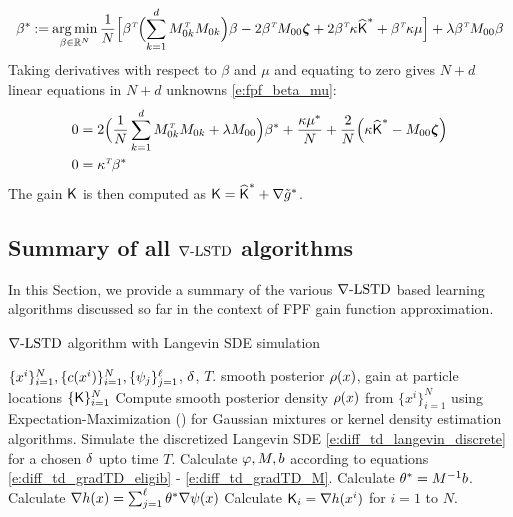 \begin{equation}
\beta ^* \mathbin{:=}
\mathop{\rm arg{\,}min}_{\beta  \in \mathbb{R}^N} \frac{1}{N} \Bigl[  \beta ^{\hbox{\tiny\it T}} \Bigl( \sum_{k=1}^d M_{0k}^{\hbox{\tiny\it T}} M_{0k} \Bigr) \beta   - 2 \beta ^{\hbox{\tiny\it T}}  M_{00} \boldsymbol{\zeta} + 2 \beta ^{\hbox{\tiny\it T}} \kappa \widehat{\text{\sf K}}^* + \beta ^{\hbox{\tiny\it T}} \kappa \mu  \Bigr]+ \lambda \beta ^{\hbox{\tiny\it T}}  M_{00} \beta
\end{equation}
Taking derivatives with respect to $\beta $ and $\mu $ and equating to zero gives $N+d$ linear equations in $N+d$ unknowns \eqref{e:fpf_beta_mu}:
\begin{equation}
\begin{aligned}
0  &=  2 \Bigl(  \frac{1}{N}  \sum_{k=1}^d M_{0k}^\transpose M_{0k}   +  \lambda M_{00} \Bigr) \beta ^* + \frac{ \kappa \mu ^*}{N}+  \frac{2}{N} \Bigl( \kappa \hakFPF^*  -   M_{00} \boldsymbol{\zeta} \Bigr)  \\
0  & = \kappa^{\transpose} \beta^*
\label{e:fpf_beta_mu}
\end{aligned}
\end{equation}
The gain $\text{\sf K}$ is then computed as
$
\text{\sf K} = \widehat{\text{\sf K}}^* + \nabla \tilde g^*$.

\subsection{Summary of all $\nabla\text{-LSTD}$ algorithms}
In this Section, we provide a summary of the various $\nabla\text{-LSTD}$ based learning algorithms discussed so far in the context of FPF gain function approximation. 

\begin{algorithm}{$\nabla\text{-LSTD}$ algorithm with Langevin SDE simulation}
	\begin{algorithmic}[1]
		\Require $\{x^i\}_{i=1}^N, \{c(x^i)\}_{i=1}^N, \{\psi_j\}_{j=1}^{\ell}$, $\delta$, $T$.
		\Ensure smooth posterior $\rho(x)$, gain at particle locations $\{\text{\sf K}\}_{i=1}^N$
		\State Compute smooth posterior density $\rho(x)$ from $\{x^i\}_{i=1}^N$ using Expectation-Maximization () for Gaussian mixtures or kernel density estimation algorithms.
		\State Simulate the discretized Langevin SDE \eqref{e:diff_td_langevin_discrete} for a chosen $\delta$ upto time $T$.
		\State Calculate $\varphi, M, b$ according to equations \eqref{e:diff_td_gradTD_eligib} - \eqref{e:diff_td_gradTD_M}.
		\State Calculate $\theta^* = M^{-1}b$.
		\State Calculate $\nabla h(x)  =  \sum_{j=1}^{\ell}  \theta^* \nabla \psi(x)$  
		\State Calculate $\text{\sf K}_i = \nabla h(x^i)$ for $i=1$ to $N$. 
	\end{algorithmic}
\end{algorithm} 

